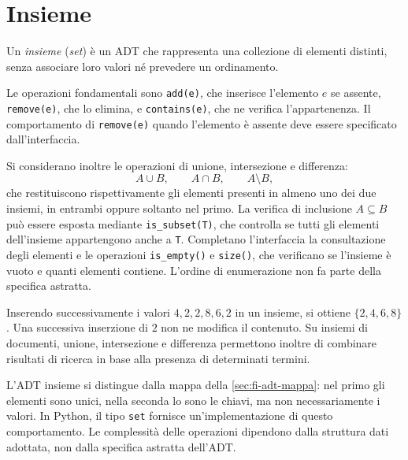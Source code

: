 \section{Insieme}
\label{sec:fi-adt-insieme}

\begin{definition}[Insieme]
\label{def:fi-adt-insieme}
Un \emph{insieme} (\emph{set}) è un ADT che rappresenta una
collezione di elementi distinti, senza associare loro valori
né prevedere un ordinamento.
\end{definition}

Le operazioni fondamentali sono \texttt{add(e)}, che inserisce
l'elemento \(e\) se assente, \texttt{remove(e)}, che lo elimina,
e \texttt{contains(e)}, che ne verifica l'appartenenza.
Il comportamento di \texttt{remove(e)} quando l'elemento è assente
deve essere specificato dall'interfaccia.

Si considerano inoltre le operazioni di unione, intersezione
e differenza:
\[
  A\cup B,\qquad A\cap B,\qquad A\setminus B,
\]
che restituiscono rispettivamente gli elementi presenti in almeno
uno dei due insiemi, in entrambi oppure soltanto nel primo.
La verifica di inclusione \(A\subseteq B\) può essere esposta
mediante \texttt{is\_subset(T)}, che controlla se tutti gli
elementi dell'insieme appartengono anche a \texttt{T}.
Completano l'interfaccia la consultazione degli elementi e le
operazioni \texttt{is\_empty()} e \texttt{size()}, che verificano
se l'insieme è vuoto e quanti elementi contiene.
L'ordine di enumerazione non fa parte della specifica astratta.

\begin{example}
Inserendo successivamente i valori \(4,2,2,8,6,2\) in un insieme,
si ottiene \(\{2,4,6,8\}\). Una successiva inserzione di \(2\)
non ne modifica il contenuto. Su insiemi di documenti, unione,
intersezione e differenza permettono inoltre di combinare risultati
di ricerca in base alla presenza di determinati termini.
\end{example}

L'ADT insieme si distingue dalla mappa della
\cref{sec:fi-adt-mappa}: nel primo gli elementi sono unici,
nella seconda lo sono le chiavi, ma non necessariamente i valori.
In Python, il tipo \texttt{set} fornisce un'implementazione
di questo comportamento. Le complessità delle operazioni
dipendono dalla struttura dati adottata, non dalla specifica
astratta dell'ADT.
